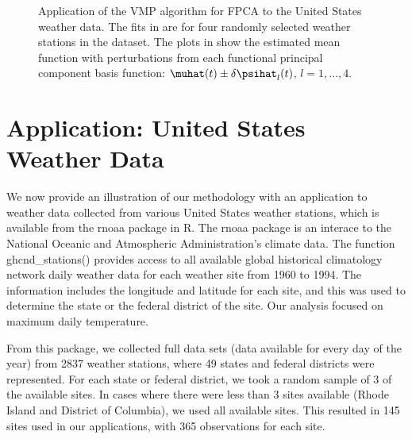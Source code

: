\documentclass[12pt]{article}
\theoremstyle{plain}
\theoremstyle{definition}
\theoremstyle{remark}
\begin{document}
\begin{figure}[t!]
\centering
\tabskip=0pt
\caption{
	Application of the VMP algorithm for FPCA to the United States weather data. The fits in 
	are for four randomly selected weather stations in the dataset.
	The plots in  show the estimated mean function with
	perturbations from each functional principal component basis function: $\muhat (t) \pm \delta \psihat_l (t)$,
	$l = 1, \dots, 4$.
}
\label{fig:us_weather_data}
\end{figure}


\section{Application: United States Weather Data}
\label{sec:us_weather_data}

We now provide an illustration of our methodology with an application to weather data collected from
various United
States weather stations, which is available from the \textsf{rnoaa} package \cite{rnoaa21} in \textsf{R}.
The \textsf{rnoaa}
package is an interace to the National Oceanic and Atmospheric Administration's climate data.
The function \textsf{ghcnd\_stations()} provides access to all available global historical climatology
network daily weather data for each weather site from 1960 to 1994. The information includes the longitude
and latitude for each site, and this was used to determine the state or the federal district of the site.
Our analysis focused on
maximum daily temperature.

From this package, we collected full data sets (data available for every day
of the year) from 2837 weather stations, where 49 states and federal districts were represented. For each
state or federal district, we took a random sample of 3 of the available sites. In cases where there were
less than 3 sites available (Rhode Island and District of Columbia), we used all available sites. This resulted
in 145 sites used in our applications, with 365 observations for each site.
\end{document}

